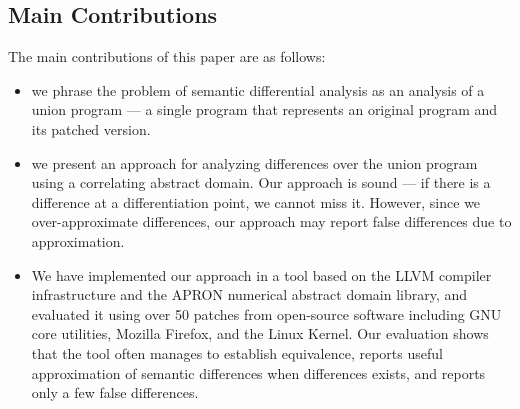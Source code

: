 \subsection{Main Contributions}
The main contributions of this paper are as follows:
\begin{itemize}
\item we phrase the problem of semantic differential analysis as an analysis of a union program --- a single program that
    represents an original program and its patched version.
\item we present an approach for analyzing differences over the union program using a correlating abstract domain. Our
    approach is sound --- if there is a difference at a differentiation point, we cannot miss it. However, since we
    over-approximate differences, our approach may report false differences due to approximation.
\item We have implemented our approach in a tool based on the LLVM compiler infrastructure and the APRON numerical abstract
    domain library, and evaluated it using over 50 patches from open-source software including GNU core utilities, Mozilla
    Firefox, and the Linux Kernel. Our evaluation shows that the tool often manages to establish equivalence, reports useful
    approximation of semantic differences when differences exists, and reports only a few false differences.
\end{itemize}


